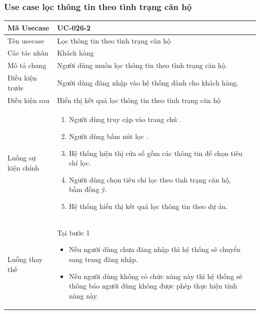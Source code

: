 \documentclass[12pt,a4paper]{article}
\begin{document}
    \subsubsection*{Use case lọc thông tin theo tình trạng căn hộ}
    \begin{table}[H]
        \centering
        \begin{tabular}{|p{3.5cm}|p{11.5cm}|c|}
            \hline
            Mã Usecase      & UC-026-2                                               \\
            \hline
            Tên usecase     & Lọc thông tin theo tình trạng căn hộ                   \\
            \hline
            Các tác nhân    & Khách hàng                                             \\
            \hline
            Mô tả chung     & Người dùng muốn lọc thông tin theo tình trạng căn hộ.  \\
            \hline

            Điều kiện trước & Người dùng đăng nhập vào hệ thống dành cho khách hàng. \\
            \hline

            Điều kiện sau   & Hiển thị kết quả lọc thông tin theo tình trạng căn hộ  \\
            \hline

            Luồng sự kiện chính & \vspace{-.8cm}\begin{enumerate}
                                                    \item Người dùng truy cập vào trang chủ .
                                                    \item Người dùng bấm nút lọc .
                                                    \item Hệ thống hiện thị cửa sổ gồm các thông tin để chọn tiêu chí lọc.
                                                    \item Người dùng chọn tiêu chí lọc theo tình trạng căn hộ, bấm đồng ý.
                                                    \item Hệ thống hiển thị kết quả lọc thông tin theo dự án.
            \end{enumerate}
            \\
            \hline
            Luồng thay thế & Tại bước 1\newline
            \vspace{-.8cm}\begin{itemize}
                              \item Nếu người dùng chưa đăng nhập thì hệ thống sẽ chuyển sang trang đăng nhập.
                              \item Nếu người dùng không có chức năng này thì hệ thống sẽ thông báo người dùng không được phép thực hiện tính năng này.
            \end{itemize}


\end{tabular}
\end{table}
\end{document}
